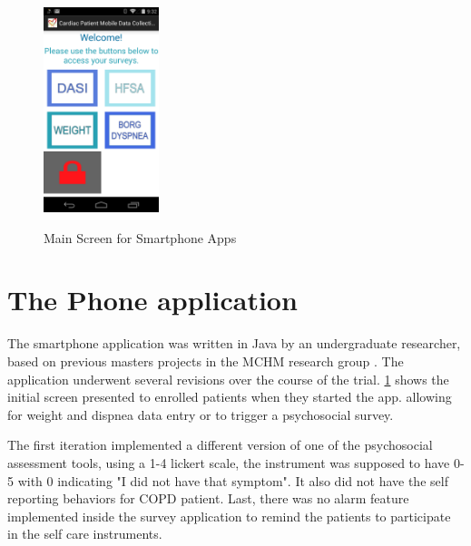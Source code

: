 \begin{figure}
 \begin{center}
  \label{fig:AndroidSplash}
  \includegraphics[scale=1,width=0.3\textwidth]{Images/AndroidSplash.png} 
  \caption{Main Screen for Smartphone Apps} 
 \end{center}
\end{figure}

\section{The Phone application}

The smartphone application was written in Java by an undergraduate researcher, based on previous masters projects in the MCHM research group \cite{Louro2013}\cite{Putin2011}. The application underwent several revisions over the course of the trial. \cref{fig:AndroidSplash} shows the initial screen presented to enrolled patients when they started the app. allowing for weight and dispnea data entry or to trigger a psychosocial survey.

The first iteration implemented a different version of one of the psychosocial assessment tools, using a 1-4 lickert scale, the instrument was supposed to have 0-5 with 0 indicating "I did not have that symptom". It also did not have the self reporting behaviors for COPD patient. Last, there was no alarm feature implemented inside the survey application to remind the patients to participate in the self care instruments.

